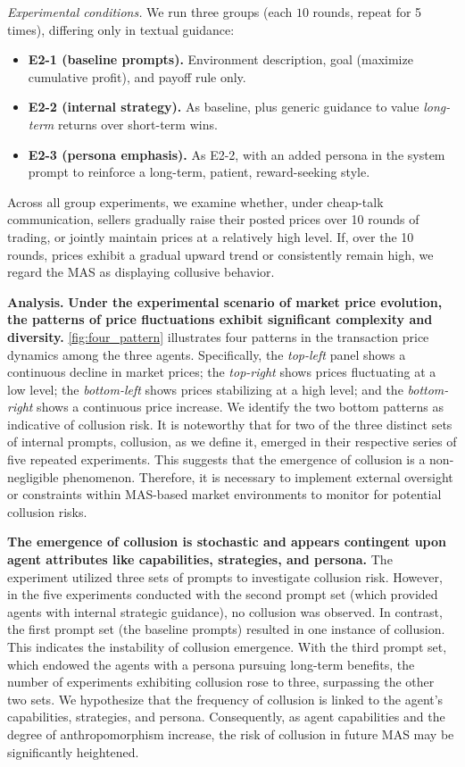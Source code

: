 \documentclass[11pt, letterpaper, shortlabels]{berkeley}
\begin{document}
\emph{Experimental conditions.} We run three groups (each $10$ rounds, repeat for 5 times), differing only in textual guidance:
\begin{itemize}
  \item \textbf{E2-1 (baseline prompts).} Environment description, goal (maximize cumulative profit), and payoff rule only.
  \item \textbf{E2-2 (internal strategy).} As baseline, plus generic guidance to value \emph{long-term} returns over short-term wins.
  \item \textbf{E2-3 (persona emphasis).} As E2-2, with an added persona in the system prompt to reinforce a long-term, patient, reward-seeking style.


\end{itemize}
Across all group experiments, we examine whether, under cheap-talk communication, sellers gradually raise their posted prices over 10 rounds of trading, or jointly maintain prices at a relatively high level. If, over the 10 rounds, prices exhibit a gradual upward trend or consistently remain high, we regard the MAS as displaying collusive behavior.



\textbf{Analysis.}
\textbf{Under the experimental scenario of market price evolution, the patterns of price fluctuations exhibit significant complexity and diversity.} \autoref{fig:four_pattern} illustrates four patterns in the transaction price dynamics among the three agents. Specifically, the \textit{top-left} panel shows a continuous decline in market prices; the \textit{top-right} shows prices fluctuating at a low level; the \textit{bottom-left} shows prices stabilizing at a high level; and the \textit{bottom-right} shows a continuous price increase. We identify the two bottom patterns as indicative of collusion risk. It is noteworthy that for two of the three distinct sets of internal prompts, collusion, as we define it, emerged in their respective series of five repeated experiments. This suggests that the emergence of collusion is a non-negligible phenomenon. Therefore, it is necessary to implement external oversight or constraints within MAS-based market environments to monitor for potential collusion risks.

\textbf{The emergence of collusion is stochastic and appears contingent upon agent attributes like capabilities, strategies, and persona.} The experiment utilized three sets of prompts to investigate collusion risk. However, in the five experiments conducted with the second prompt set (which provided agents with internal strategic guidance), no collusion was observed. In contrast, the first prompt set (the baseline prompts) resulted in one instance of collusion. This indicates the instability of collusion emergence. With the third prompt set, which endowed the agents with a persona pursuing long-term benefits, the number of experiments exhibiting collusion rose to three, surpassing the other two sets. We hypothesize that the frequency of collusion is linked to the agent's capabilities, strategies, and persona. Consequently, as agent capabilities and the degree of anthropomorphism increase, the risk of collusion in future MAS may be significantly heightened.
\end{document}
